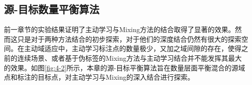 
    \subsection{源-目标数量平衡算法}
    前一章节的实验结果证明了主动学习与Mixing方法的结合取得了显著的效果。然而这只是对于两种方法结合的初步探索，对于他们的深度结合仍然有很大的探索空间。在主动域适应中，主动学习标注点的数量极少，又加之域间隙的存在，使得之前的连续场景、或者基于伪标签的Mixing方法与主动学习结合并不能发挥其最大的效果。如图\ref{fig:4-2}所示，本章的源-目标平衡算法旨在数量层面平衡混合的源域点和标注的目标点，对主动学习与Mixing的深入结合进行探索。
    
